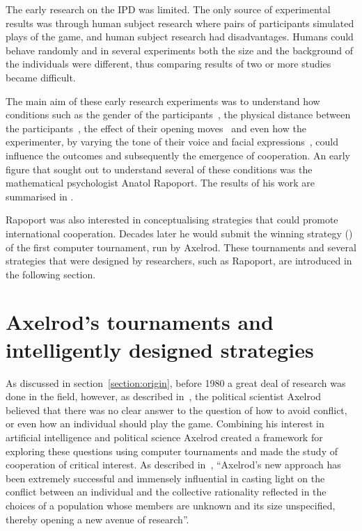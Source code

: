 The early research on the IPD was limited. The only source of
experimental results was through human subject research where pairs of
participants simulated plays of the game, and human subject research had
disadvantages. Humans could behave randomly and in several experiments both the
size and the background of the individuals were different, thus comparing
results of two or more studies became difficult.

The main aim of these early research experiments was to understand how
conditions such as the gender of the participants~\cite{Evans1966, Lutzker1961,
Mack1971}, the physical distance between the participants~\cite{Sensenig1972}, the
effect of their opening moves~\cite{Tedeschi1968} and even how the experimenter, by varying
the tone of their voice and facial expressions~\cite{Gallo1968}, could influence
the outcomes and subsequently the emergence of cooperation. An early figure that
sought out to understand several of these conditions was the mathematical
psychologist Anatol Rapoport. The results of his work are summarised
in \cite{rapoport1965}.

Rapoport was also interested in conceptualising strategies that could promote
international cooperation. Decades later he would submit the winning strategy
(\TitForTat) of the first computer tournament, run by Axelrod.
These tournaments and several strategies that were designed by researchers, such
as Rapoport, are introduced in the following section.

\section{Axelrod's tournaments and intelligently designed strategies}
\label{section:intelligent_design}

As discussed in section~\ref{section:origin}, before 1980 a great deal of
research was done in the field, however, as described in~\cite{Axelrod2012}, the
political scientist Axelrod believed that there was no clear answer to the
question of how to avoid conflict, or even how an individual should play the
game. Combining his interest in artificial intelligence and political science
Axelrod created a framework for exploring these questions using computer
tournaments and made the study of cooperation of critical interest. As
described in~\cite{Rapoport2015}, ``Axelrod's new approach has been extremely
successful and immensely influential in casting light on the conflict between an
individual and the collective rationality reflected in the choices of a
population whose members are unknown and its size unspecified, thereby opening a
new avenue of research''.


